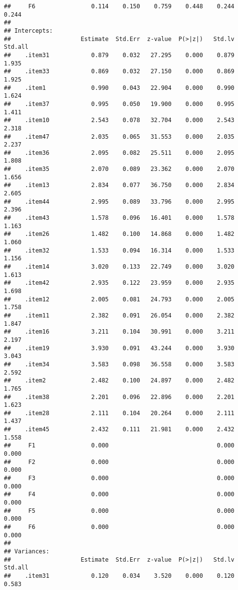 \documentclass[
  english,
  man]{apa6}
\begin{document}
\begin{verbatim}
##     F6                0.114    0.150    0.759    0.448    0.244    0.244
## 
## Intercepts:
##                    Estimate  Std.Err  z-value  P(>|z|)   Std.lv  Std.all
##    .item31            0.879    0.032   27.295    0.000    0.879    1.935
##    .item33            0.869    0.032   27.150    0.000    0.869    1.925
##    .item1             0.990    0.043   22.904    0.000    0.990    1.624
##    .item37            0.995    0.050   19.900    0.000    0.995    1.411
##    .item10            2.543    0.078   32.704    0.000    2.543    2.318
##    .item47            2.035    0.065   31.553    0.000    2.035    2.237
##    .item36            2.095    0.082   25.511    0.000    2.095    1.808
##    .item35            2.070    0.089   23.362    0.000    2.070    1.656
##    .item13            2.834    0.077   36.750    0.000    2.834    2.605
##    .item44            2.995    0.089   33.796    0.000    2.995    2.396
##    .item43            1.578    0.096   16.401    0.000    1.578    1.163
##    .item26            1.482    0.100   14.868    0.000    1.482    1.060
##    .item32            1.533    0.094   16.314    0.000    1.533    1.156
##    .item14            3.020    0.133   22.749    0.000    3.020    1.613
##    .item42            2.935    0.122   23.959    0.000    2.935    1.698
##    .item12            2.005    0.081   24.793    0.000    2.005    1.758
##    .item11            2.382    0.091   26.054    0.000    2.382    1.847
##    .item16            3.211    0.104   30.991    0.000    3.211    2.197
##    .item19            3.930    0.091   43.244    0.000    3.930    3.043
##    .item34            3.583    0.098   36.558    0.000    3.583    2.592
##    .item2             2.482    0.100   24.897    0.000    2.482    1.765
##    .item38            2.201    0.096   22.896    0.000    2.201    1.623
##    .item28            2.111    0.104   20.264    0.000    2.111    1.437
##    .item45            2.432    0.111   21.981    0.000    2.432    1.558
##     F1                0.000                               0.000    0.000
##     F2                0.000                               0.000    0.000
##     F3                0.000                               0.000    0.000
##     F4                0.000                               0.000    0.000
##     F5                0.000                               0.000    0.000
##     F6                0.000                               0.000    0.000
## 
## Variances:
##                    Estimate  Std.Err  z-value  P(>|z|)   Std.lv  Std.all
##    .item31            0.120    0.034    3.520    0.000    0.120    0.583

\end{verbatim}
\end{document}
